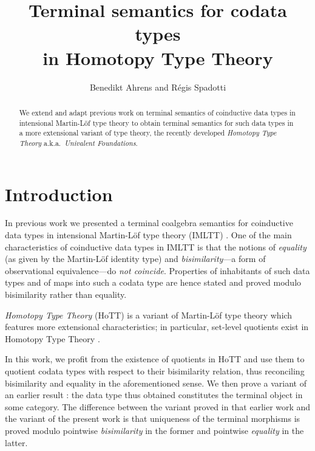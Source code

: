 \documentclass[envcountsame]{llncs}
\begin{document}
\title{Terminal semantics for codata types\\in Homotopy Type Theory}

\author{Benedikt Ahrens and R\'egis Spadotti}


\newcommand{\fat}[1]{\textbf{#1}}





\maketitle


\begin{abstract}

 We extend and adapt previous work on terminal semantics of coinductive data types in intensional Martin-Löf type theory to
 obtain terminal semantics for such data types in a more extensional variant of type theory, the recently developed 
 \emph{Homotopy Type Theory} a.k.a.\ \emph{Univalent Foundations}.
   
\end{abstract}




\section{Introduction}
 
 In previous work \parencite{trimat_coq} we presented a terminal coalgebra semantics for coinductive data types in
 intensional Martin-Löf type theory (IMLTT) \parencite{martin_lof}.
 One of the main characteristics of coinductive data types in IMLTT is that the notions of \emph{equality}
 (as given by the Martin-Löf identity type) and \emph{bisimilarity}---a form of observational equivalence---do \emph{not
 coincide}. Properties of inhabitants of such data types and of maps into such a codata type are hence stated and proved modulo bisimilarity rather than equality.
 
 \emph{Homotopy Type Theory} (HoTT) \parencite{hottbook} is a variant of Martin-Löf type theory which features more extensional 
 characteristics; in particular, set-level quotients exist in Homotopy Type Theory \parencite[Chap.\ 6.10]{hottbook}.
 
 In this work, we profit from the existence of quotients in HoTT and use them to quotient codata types with respect to their
 bisimilarity relation, thus reconciling bisimilarity and equality in the aforementioned sense.
 We then prove a variant of an earlier result \parencite{trimat_coq}: the data type thus obtained constitutes the terminal 
 object in some category.
 The difference between the variant proved in that earlier work and the variant of the present work is that uniqueness of the terminal
 morphisms is proved modulo pointwise \emph{bisimilarity} in the former and pointwise \emph{equality} in the latter.
 
 
\printbibliography


\appendix



% 
\end{document}
